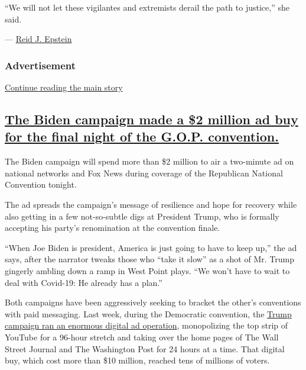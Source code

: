 ``We will not let these vigilantes and extremists derail the path to
justice,'' she said.

--- \href{https://www.nytimes3xbfgragh.onion/by/reid-j-epstein}{Reid J.
Epstein}

\hypertarget{advertisement-8}{%
\subsubsection{Advertisement}\label{advertisement-8}}

\protect\hyperlink{after-dfp-ad-mid9}{Continue reading the main story}

\hypertarget{the-biden-campaign-made-a-2-million-ad-buy-for-the-final-night-of-the-gop-convention}{%
\subsection{\texorpdfstring{\protect\hyperlink{the-biden-campaign-made-a-2-million-ad-buy-for-the-final-night-of-the-gop-convention}{The
Biden campaign made a \$2 million ad buy for the final night of the
G.O.P.
convention.}}{The Biden campaign made a \$2 million ad buy for the final night of the G.O.P. convention.}}\label{the-biden-campaign-made-a-2-million-ad-buy-for-the-final-night-of-the-gop-convention}}

The Biden campaign will spend more than \$2 million to air a two-minute
ad on national networks and Fox News during coverage of the Republican
National Convention tonight.

The ad spreads the campaign's message of resilience and hope for
recovery while also getting in a few not-so-subtle digs at President
Trump, who is formally accepting his party's renomination at the
convention finale.

``When Joe Biden is president, America is just going to have to keep
up,'' the ad says, after the narrator tweaks those who ``take it slow''
as a shot of Mr. Trump gingerly ambling down a ramp in West Point plays.
``We won't have to wait to deal with Covid-19: He already has a plan.''

Both campaigns have been aggressively seeking to bracket the other's
conventions with paid messaging. Last week, during the Democratic
convention, the
\href{https://www.nytimes3xbfgragh.onion/2020/08/15/us/politics/trump-campaign-ads-dnc.html}{Trump
campaign ran an enormous digital ad operation}, monopolizing the top
strip of YouTube for a 96-hour stretch and taking over the home pages of
The Wall Street Journal and The Washington Post for 24 hours at a time.
That digital buy, which cost more than \$10 million, reached tens of
millions of voters.

